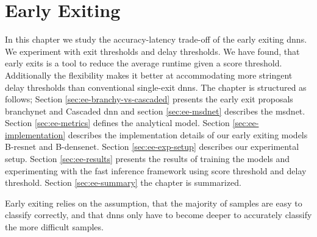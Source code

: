 \hypertarget{earlyexiting}{%
	\chapter{Early Exiting}\label{ch:earlyexit}}

In this chapter we study the accuracy-latency trade-off of the early exiting \gls{dnn}s. We experiment with exit thresholds and delay thresholds. We have found, that early exits is a tool to reduce the average runtime given a score threshold. Additionally the flexibility makes it better at accommodating more stringent delay thresholds than conventional single-exit \gls{dnn}s. The chapter is structured as follows; Section \ref{sec:ee-branchy-vs-cascaded} presents the early exit proposals \gls{branchynet} and Cascaded \gls{dnn} and section \ref{sec:ee-msdnet} describes the \gls{msdnet}. Section \ref{sec:ee-metrics} defines the analytical model. Section \ref{sec:ee-implementation} describes the implementation details of our early exiting models B-\gls{resnet} and B-\gls{densenet}. Section \ref{sec:ee-exp-setup} describes our experimental setup. Section \ref{sec:ee-results} presents the results of training the models and experimenting with the fast inference framework using score threshold and delay threshold. Section \ref{sec:ee-summary} the chapter is summarized.

Early exiting relies on the assumption, that the majority of samples are easy to classify correctly, and that \gls{dnn}s only have to become deeper to accurately classify the more difficult samples. 

